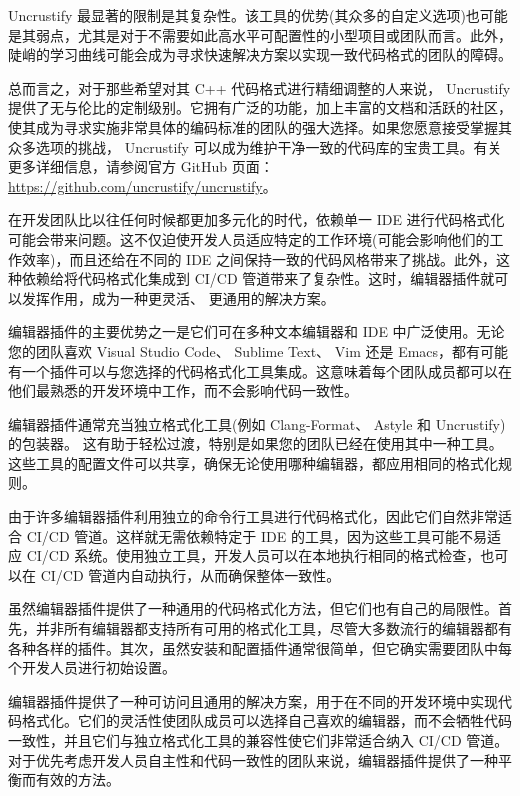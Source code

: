 Uncrustify 最显著的限制是其复杂性。该工具的优势(其众多的自定义选项)也可能是其弱点，尤其是对于不需要如此高水平可配置性的小型项目或团队而言。此外，陡峭的学习曲线可能会成为寻求快速解决方案以实现一致代码格式的团队的障碍。

总而言之，对于那些希望对其 C++ 代码格式进行精细调整的人来说， Uncrustify 提供了无与伦比的定制级别。它拥有广泛的功能，加上丰富的文档和活跃的社区，使其成为寻求实施非常具体的编码标准的团队的强大选择。如果您愿意接受掌握其众多选项的挑战， Uncrustify 可以成为维护干净一致的代码库的宝贵工具。有关更多详细信息，请参阅官方 GitHub 页面： \url{https://github.com/uncrustify/uncrustify}。


在开发团队比以往任何时候都更加多元化的时代，依赖单一 IDE 进行代码格式化可能会带来问题。这不仅迫使开发人员适应特定的工作环境(可能会影响他们的工作效率)，而且还给在不同的 IDE 之间保持一致的代码风格带来了挑战。此外，这种依赖给将代码格式化集成到 CI/CD 管道带来了复杂性。这时，编辑器插件就可以发挥作用，成为一种更灵活、 更通用的解决方案。

编辑器插件的主要优势之一是它们可在多种文本编辑器和 IDE 中广泛使用。无论您的团队喜欢 Visual Studio Code、 Sublime Text、 Vim 还是 Emacs，都有可能有一个插件可以与您选择的代码格式化工具集成。这意味着每个团队成员都可以在他们最熟悉的开发环境中工作，而不会影响代码一致性。

编辑器插件通常充当独立格式化工具(例如 Clang-Format、 Astyle 和 Uncrustify)的包装器。
这有助于轻松过渡，特别是如果您的团队已经在使用其中一种工具。这些工具的配置文件可以共享，确保无论使用哪种编辑器，都应用相同的格式化规则。

由于许多编辑器插件利用独立的命令行工具进行代码格式化，因此它们自然非常适合 CI/CD 管道。这样就无需依赖特定于 IDE 的工具，因为这些工具可能不易适应 CI/CD 系统。使用独立工具，开发人员可以在本地执行相同的格式检查，也可以在 CI/CD 管道内自动执行，从而确保整体一致性。

虽然编辑器插件提供了一种通用的代码格式化方法，但它们也有自己的局限性。首先，并非所有编辑器都支持所有可用的格式化工具，尽管大多数流行的编辑器都有各种各样的插件。其次，虽然安装和配置插件通常很简单，但它确实需要团队中每个开发人员进行初始设置。

编辑器插件提供了一种可访问且通用的解决方案，用于在不同的开发环境中实现代码格式化。它们的灵活性使团队成员可以选择自己喜欢的编辑器，而不会牺牲代码一致性，并且它们与独立格式化工具的兼容性使它们非常适合纳入 CI/CD 管道。对于优先考虑开发人员自主性和代码一致性的团队来说，编辑器插件提供了一种平衡而有效的方法。


